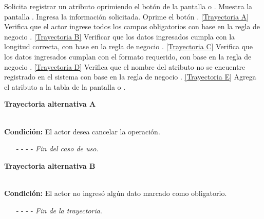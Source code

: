 	\begin{UCtrayectoria}
		\UCpaso[\UCactor] Solicita registrar un atributo oprimiendo el botón  de la pantalla  o .
		\UCpaso[\UCsist] Muestra la pantalla .
		\UCpaso[\UCactor] Ingresa la información solicitada. \label{CU7.1.1-P3}
		\UCpaso[\UCactor] Oprime el botón . \hyperlink{CU7-1-1:TAA}{[Trayectoria A]}
		\UCpaso[\UCsist] Verifica que el actor ingrese todos los campos obligatorios con base en la regla de negocio . \hyperlink{CU7-1-1:TAB}{[Trayectoria B]}
		\UCpaso[\UCsist] Verificar que los datos ingresados cumpla con la longitud correcta, con base en la regla de negocio . \hyperlink{CU7-1-1:TAC}{[Trayectoria C]}
		\UCpaso[\UCsist] Verifica que los datos ingresados cumplan con el formato requerido, con base en la regla de negocio . \hyperlink{CU7-1-1:TAD}{[Trayectoria D]}
		\UCpaso[\UCsist] Verifica que el nombre del atributo no se encuentre registrado en el sistema con base en la regla de negocio . \hyperlink{CU7-1-1:TAE}{[Trayectoria E]}
		\UCpaso[\UCsist] Agrega el atributo a la tabla  de la pantalla  o .
	\end{UCtrayectoria}		
\hypertarget{CU7-1-1:TAA}{\textbf{Trayectoria alternativa A}}\\
\noindent \textbf{Condición:} El actor desea cancelar la operación.
\begin{enumerate}
	\UCpaso[\UCactor] Solicita cancelar la operación oprimiendo el botón  de la pantalla 
	\UCpaso[\UCsist] Muestra la pantalla .
	\item[- -] - - {\em {Fin del caso de uso}}.%
\end{enumerate}
\hypertarget{CU7-1-1:TAB}{\textbf{Trayectoria alternativa B}}\\
\noindent \textbf{Condición:} El actor no ingresó algún dato marcado como obligatorio.
\begin{enumerate}
	\UCpaso[\UCsist] Muestra el mensaje  señalando el campo que presenta el error en la pantalla .
	\UCpaso Regresa al paso \ref{CU7.1.1-P3} de la trayectoria principal.
	\item[- -] - - {\em {Fin de la trayectoria}}.%
\end{enumerate}
